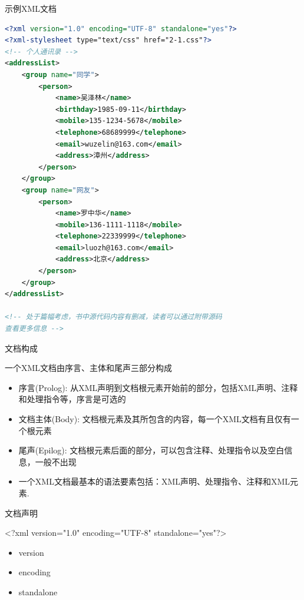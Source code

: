 \begin{frame}{示例XML文档}
\begin{lstlisting}[tabsize=8, basicstyle=\small\tt, language=XML]
<?xml version="1.0" encoding="UTF-8" standalone="yes"?>
<?xml-stylesheet type="text/css" href="2-1.css"?>
<!-- 个人通讯录 -->
<addressList>
    <group name="同学">
        <person>
            <name>吴泽林</name>
            <birthday>1985-09-11</birthday>
            <mobile>135-1234-5678</mobile>
            <telephone>68689999</telephone>
            <email>wuzelin@163.com</email>
            <address>漳州</address>
        </person>
    </group>
    <group name="网友">
        <person>
            <name>罗中华</name>
            <mobile>136-1111-1118</mobile>
            <telephone>22339999</telephone>
            <email>luozh@163.com</email>
            <address>北京</address>
        </person>
    </group>
</addressList>

<!-- 处于篇幅考虑，书中源代码内容有删减，读者可以通过附带源码
查看更多信息 -->
\end{lstlisting}
\end{frame}


\begin{frame}{文档构成}
\par 一个XML文档由序言、主体和尾声三部分构成
\begin{itemize}
\item 序言(Prolog): 从XML声明到文档根元素开始前的部分，包括XML声明、注释和处理指令等，序言是可选的
\item 文档主体(Body): 文档根元素及其所包含的内容，每一个XML文档有且仅有一个根元素
\item 尾声(Epilog): 文档根元素后面的部分，可以包含注释、处理指令以及空白信息，一般不出现
\item 一个XML文档最基本的语法要素包括：XML声明、处理指令、注释和XML元素.
\end{itemize}
\end{frame}


\begin{frame}{文档声明}
\begin{shaded}
<?xml version="1.0" encoding="UTF-8" standalone="yes"?>
\end{shaded}

\begin{itemize}
\item version
\item  encoding
\item standalone
\end{itemize}
\end{frame}


